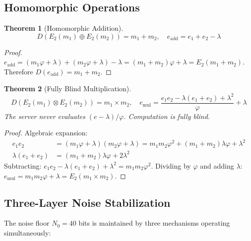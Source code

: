 \documentclass{article}
\newtheorem{theorem}{Theorem}[section]
\begin{document}
\subsection{Homomorphic Operations}

\begin{theorem}[Homomorphic Addition]
\begin{equation}
D(E_2(m_1) \oplus E_2(m_2)) = m_1 + m_2, \quad e_{\text{add}} = e_1 + e_2 - \lambda
\end{equation}
\end{theorem}

\begin{proof}
$e_{\text{add}} = (m_1\varphi + \lambda) + (m_2\varphi + \lambda) - \lambda = (m_1+m_2)\varphi + \lambda = E_2(m_1+m_2)$. Therefore $D(e_{\text{add}}) = m_1 + m_2$.
\end{proof}

\begin{theorem}[Fully Blind Multiplication]
\begin{equation}
D(E_2(m_1) \otimes E_2(m_2)) = m_1 \times m_2, \quad e_{\text{mul}} = \frac{e_1 e_2 - \lambda(e_1 + e_2) + \lambda^2}{\varphi} + \lambda
\end{equation}
The server never evaluates $(e - \lambda)/\varphi$. Computation is fully blind.
\end{theorem}

\begin{proof}
Algebraic expansion:
\begin{align}
e_1 e_2 &= (m_1\varphi + \lambda)(m_2\varphi + \lambda) = m_1 m_2 \varphi^2 + (m_1+m_2)\lambda\varphi + \lambda^2 \\
\lambda(e_1+e_2) &= (m_1+m_2)\lambda\varphi + 2\lambda^2
\end{align}
Subtracting: $e_1 e_2 - \lambda(e_1+e_2) + \lambda^2 = m_1 m_2 \varphi^2$. Dividing by $\varphi$ and adding $\lambda$: $e_{\text{mul}} = m_1 m_2 \varphi + \lambda = E_2(m_1 \times m_2)$.
\end{proof}

\subsection{Three-Layer Noise Stabilization}

The noise floor $N_0 = 40$ bits is maintained by three mechanisms operating simultaneously:
\end{document}
